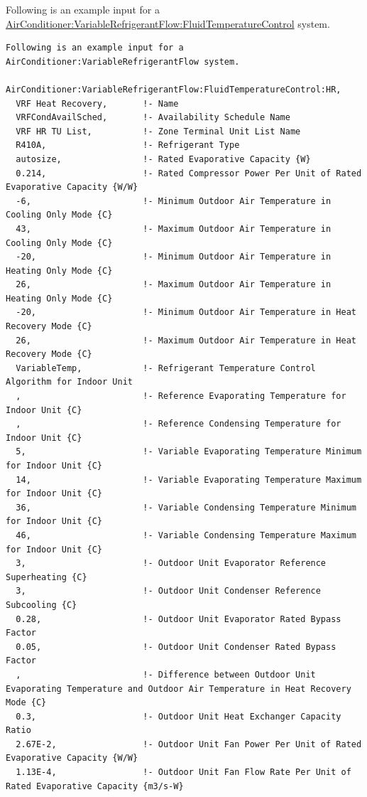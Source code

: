 Following is an example input for a \hyperref[airconditionervariablerefrigerantflowfluidtemperaturecontrol]{AirConditioner:VariableRefrigerantFlow:FluidTemperatureControl} system.

\begin{lstlisting}
Following is an example input for a AirConditioner:VariableRefrigerantFlow system.

AirConditioner:VariableRefrigerantFlow:FluidTemperatureControl:HR,
  VRF Heat Recovery,       !- Name
  VRFCondAvailSched,       !- Availability Schedule Name
  VRF HR TU List,          !- Zone Terminal Unit List Name
  R410A,                   !- Refrigerant Type
  autosize,                !- Rated Evaporative Capacity {W}
  0.214,                   !- Rated Compressor Power Per Unit of Rated Evaporative Capacity {W/W}
  -6,                      !- Minimum Outdoor Air Temperature in Cooling Only Mode {C}
  43,                      !- Maximum Outdoor Air Temperature in Cooling Only Mode {C}
  -20,                     !- Minimum Outdoor Air Temperature in Heating Only Mode {C}
  26,                      !- Maximum Outdoor Air Temperature in Heating Only Mode {C}
  -20,                     !- Minimum Outdoor Air Temperature in Heat Recovery Mode {C}
  26,                      !- Maximum Outdoor Air Temperature in Heat Recovery Mode {C}
  VariableTemp,            !- Refrigerant Temperature Control Algorithm for Indoor Unit
  ,                        !- Reference Evaporating Temperature for Indoor Unit {C}
  ,                        !- Reference Condensing Temperature for Indoor Unit {C}
  5,                       !- Variable Evaporating Temperature Minimum for Indoor Unit {C}
  14,                      !- Variable Evaporating Temperature Maximum for Indoor Unit {C}
  36,                      !- Variable Condensing Temperature Minimum for Indoor Unit {C}
  46,                      !- Variable Condensing Temperature Maximum for Indoor Unit {C}
  3,                       !- Outdoor Unit Evaporator Reference Superheating {C}
  3,                       !- Outdoor Unit Condenser Reference Subcooling {C}
  0.28,                    !- Outdoor Unit Evaporator Rated Bypass Factor
  0.05,                    !- Outdoor Unit Condenser Rated Bypass Factor
  ,                        !- Difference between Outdoor Unit Evaporating Temperature and Outdoor Air Temperature in Heat Recovery Mode {C}
  0.3,                     !- Outdoor Unit Heat Exchanger Capacity Ratio
  2.67E-2,                 !- Outdoor Unit Fan Power Per Unit of Rated Evaporative Capacity {W/W}
  1.13E-4,                 !- Outdoor Unit Fan Flow Rate Per Unit of Rated Evaporative Capacity {m3/s-W}

\end{lstlisting}
